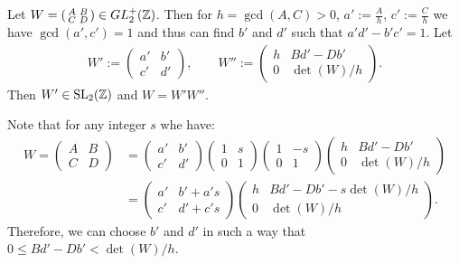 \documentclass{article}
\begin{document}
\begin{Lemma}
  \label{thm:W-splitting}
  Let
  $W=\left(\begin{smallmatrix}A&B\\C&D\end{smallmatrix}\right) \in
  GL_2^+(\mathbb{Z})$.
  Then for $h=\gcd(A, C)>0$, $a':=\frac{A}{h}$, $c':=\frac{C}{h}$ we
  have $\gcd(a', c')=1$ and thus can find $b'$ and $d'$ such that
  $a'd'-b'c'=1$.
  Let
  \begin{gather*}
    W':=\begin{pmatrix}a'&b'\\c'&d'\end{pmatrix},
    \qquad
    W''
    :=
    \begin{pmatrix}
      h &B d'-D b'\\
      0 & \det(W) / h
    \end{pmatrix}.
  \end{gather*}
  Then $W'\in \SL2Z$ and $W = W' W''$.
\end{Lemma}


Note that for any integer $s$ whe have:
\begin{align}
W = \begin{pmatrix}A&B\\C&D\end{pmatrix}
&=\begin{pmatrix}a'&b'\\c'&d'\end{pmatrix}
  \begin{pmatrix}1& s\\0&1\end{pmatrix}
  \begin{pmatrix}1&-s\\0&1\end{pmatrix}
  \begin{pmatrix}h &B d'- D b'\\0 &\det(W) / h\end{pmatrix}
  \\
&=
  \begin{pmatrix} a'&b' + a' s\\ c'&d' + c' s \end{pmatrix}
  \begin{pmatrix}
    h &B d'- D b'- s \det(W) / h\\
    0 &\det(W) / h\end{pmatrix}.
\end{align}
Therefore, we can choose $b'$ and $d'$ in such a way that
$0 \le B d'-D b' < \det(W)/h$.
\end{document}
